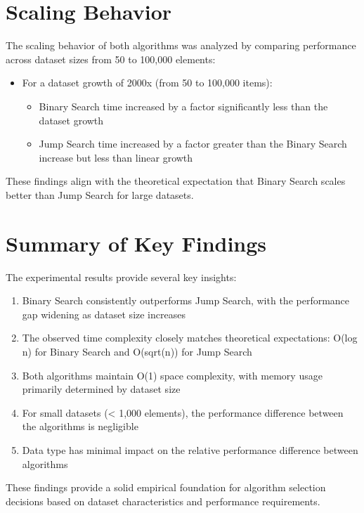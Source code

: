 \section{Scaling Behavior}

The scaling behavior of both algorithms was analyzed by comparing performance across dataset sizes from 50 to 100,000 elements:

\begin{itemize}
    \item For a dataset growth of 2000x (from 50 to 100,000 items):
    \begin{itemize}
        \item Binary Search time increased by a factor significantly less than the dataset growth
        \item Jump Search time increased by a factor greater than the Binary Search increase but less than linear growth
    \end{itemize}
\end{itemize}

These findings align with the theoretical expectation that Binary Search scales better than Jump Search for large datasets.

\section{Summary of Key Findings}

The experimental results provide several key insights:

\begin{enumerate}
    \item Binary Search consistently outperforms Jump Search, with the performance gap widening as dataset size increases
    \item The observed time complexity closely matches theoretical expectations: O(log n) for Binary Search and O(sqrt(n)) for Jump Search
    \item Both algorithms maintain O(1) space complexity, with memory usage primarily determined by dataset size
    \item For small datasets (< 1,000 elements), the performance difference between the algorithms is negligible
    \item Data type has minimal impact on the relative performance difference between algorithms
\end{enumerate}

These findings provide a solid empirical foundation for algorithm selection decisions based on dataset characteristics and performance requirements.